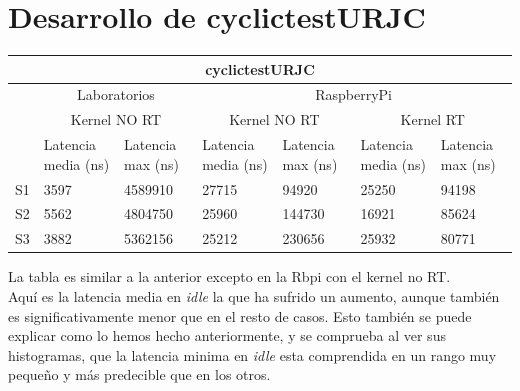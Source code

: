 \documentclass[12pt, a4paper]{report}
\begin{document}
	\chapter*{Desarrollo de cyclictestURJC}
	\begin{center}
		\setlength\extrarowheight{4pt}
		\begin{tabular}{ |p{1cm}|p{2cm}|p{2cm}|p{2cm}|p{2cm}|p{2cm}|p{2cm}| } 
			\hline
			\multicolumn{7}{|c|}{\textbf{cyclictestURJC}}\\ 
			\hline
			& \multicolumn{2}{|c|}{Laboratorios} & \multicolumn{4}{|c|}{RaspberryPi}\\ 
			\cline{2-7}
			& \multicolumn{2}{|c|}{Kernel NO RT} & \multicolumn{2}{|c|}{Kernel NO RT} & \multicolumn{2}{|c|}{Kernel RT}\\ 
			\cline{2-7}
			& Latencia media (ns) & Latencia max (ns)& Latencia media (ns) & Latencia max (ns)& Latencia media (ns) & Latencia max (ns)\\ 
			\hline
			S1 & 3597& 4589910& 27715&  94920& 25250& 94198\\ 
			\hline
			S2 & 5562& 4804750& 25960& 144730& 16921& 85624\\ 
			\hline
			S3 & 3882& 5362156& 25212& 230656& 25932& 80771\\ 
			\hline
		\end{tabular}
	\end{center}
	La tabla es similar a la anterior excepto en la Rbpi con el kernel no RT.\\
	\newline
	Aquí es la latencia media en \textit{idle} la que ha sufrido un aumento, aunque también es significativamente menor que en el resto de casos. Esto también se puede explicar como lo hemos hecho anteriormente, y se comprueba al ver sus histogramas, que la latencia minima en \textit{idle} esta comprendida en un rango muy pequeño y más predecible que en los otros.\\
	
\end{document}

